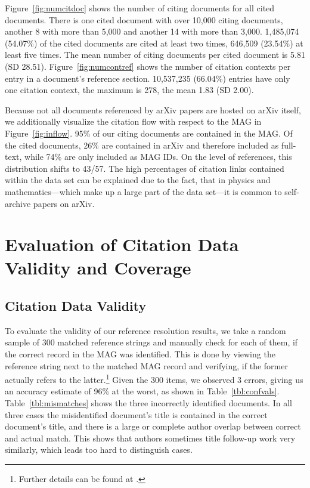 Figure~\ref{fig:numcitdoc} shows the number of citing documents for all cited documents. There is one cited document with over 10,000 citing documents, another 8 with more than 5,000 and another 14 with more than 3,000. 1,485,074 (54.07\%) of the cited documents are cited at least two times, 646,509 (23.54\%) at least five times. The mean number of citing documents per cited document is 5.81 (SD 28.51). Figure~\ref{fig:numcontref} shows the number of citation contexts per entry in a document's reference section. 10,537,235 (66.04\%) entries have only one citation context, the maximum is 278, the mean 1.83 (SD 2.00).

Because not all documents referenced by arXiv papers are hosted on arXiv itself, we additionally visualize the citation flow with respect to the MAG in Figure~\ref{fig:inflow}. 95\% of our citing documents are contained in the MAG. Of the cited documents, 26\% are contained in arXiv and therefore included as full-text, while 74\% are only included as MAG IDs. On the level of references, this distribution shifts to 43/57. The high percentages of citation links contained within the data set can be explained due to the fact, that in physics and mathematics---which make up a large part of the data set---it is common to self-archive papers on arXiv.

\section{Evaluation of Citation Data Validity and Coverage}
\label{sec:evaluation-validity-and-coverage}

\subsection{Citation Data Validity}
\label{sec:evaluation-reference-resolution}
To evaluate the validity of our reference resolution results, we take a random sample of 300 matched reference strings and manually check for each of them, if the correct record in the MAG was identified. This is done by viewing the reference string next to the matched MAG record and verifying, if the former actually refers to the latter.\footnote{Further details can be found at .} Given the 300 items, we observed 3 errors, giving us an accuracy estimate of 96\% at the worst, as shown in Table~\ref{tbl:confvals}. Table~\ref{tbl:mismatches} shows the three incorrectly identified documents. In all three cases the misidentified document's title is contained in the correct document's title, and there is a large or complete author overlap between correct and actual match. This shows that authors sometimes title follow-up work very similarly, which leads too hard to distinguish cases.

